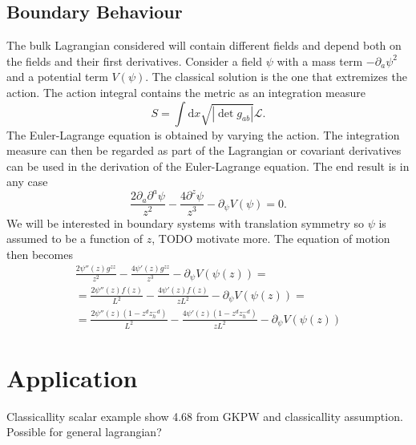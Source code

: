 \documentclass[12pt]{report}
\renewcommand{\d}{\ensuremath{\mathrm{d}}}
\renewcommand{\L}{\ensuremath{\mathcal{L}}}
\begin{document}
\subsection{Boundary Behaviour}
The bulk Lagrangian considered will contain different fields and depend both on the fields and their first derivatives. Consider a field $\psi$ with a mass term $-\partial_a\psi^2$ and a potential term $V(\psi)$. The classical solution is the one that extremizes the action. The action integral contains the metric as an integration measure
\begin{equation}
 S=\int\d x\sqrt{|\det g_{ab}|}\L.
\end{equation}
The Euler-Lagrange equation is obtained by varying the action. The integration measure can then be regarded as part of the Lagrangian or covariant derivatives can be used in the derivation of the Euler-Lagrange equation. The end result is in any case
\begin{equation}
\frac{2\partial_a\partial^a\psi}{z^2}-\frac{4\partial^z\psi}{z^3}-\partial_\psi V(\psi)=0.
\end{equation}
We will be interested in boundary systems with translation symmetry so $\psi$ is assumed to be a function of $z$, TODO motivate more. The equation of motion then becomes
\begin{equation}
\begin{split}
\frac{2\psi''(z)g^{zz}}{z^2}-\frac{4\psi'(z)g^{zz}}{z^3}-\partial_\psi V(\psi(z))=\\
=\frac{2\psi''(z)f(z)}{L^2}-\frac{4\psi'(z)f(z)}{zL^2}-\partial_\psi V(\psi(z))=\\
=\frac{2\psi''(z)(1-z^dz_h^{-d})}{L^2}-\frac{4\psi'(z)(1-z^dz_h^{-d})}{zL^2}-\partial_\psi V(\psi(z))
\end{split}
\end{equation}

\section{Application}
Classicallity
scalar example
show 4.68 from GKPW and classicallity assumption. Possible for general lagrangian?
\end{document}
